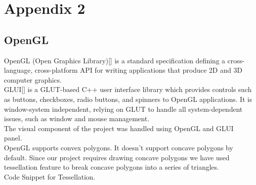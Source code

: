

\chapter{Appendix 2}

\section*{OpenGL}

OpenGL (Open Graphics Library)[\cite{OpenGL}] is a standard specification defining a cross-language, cross-platform API for writing applications that produce 2D and 3D computer graphics.\\

\noindent GLUI[\cite{GLUI}] is a GLUT-based C++ user interface library which provides controls such as buttons, checkboxes, radio buttons, and spinners to OpenGL applications. It is window-system independent, relying on GLUT to handle all system-dependent issues, such as window and mouse management.\\
The visual component of the project was handled using OpenGL and GLUI panel.\\

\noindent OpenGL supports convex polygons. It doesn’t support concave polygons by default. Since our project requires drawing concave polygons we have used tessellation feature to break concave polygons into a series of triangles.\\
Code Snippet for Tessellation.\\

